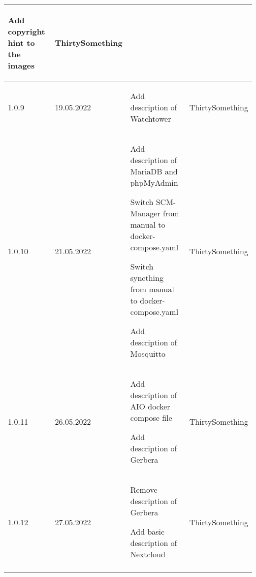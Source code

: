 \begin{tiny}
\begin{longtable}{ | p{} | p{} | P{0.49\textwidth} | p{0.15\textwidth} | }
\begin{tsLTItemize}
            \item Add copyright hint to the images
        \end{tsLTItemize}
                                 &
        ThirtySomething            \\
        \hline
        1.0.9                    &
        19.05.2022               &
        \begin{tsLTItemize}
            \item Add description of Watchtower
        \end{tsLTItemize}
                                 &
        ThirtySomething            \\
        \hline
        1.0.10                   &
        21.05.2022               &
        \begin{tsLTItemize}
            \item Add description of MariaDB and phpMyAdmin
            \item Switch SCM-Manager from manual to docker-compose.yaml
            \item Switch syncthing from manual to docker-compose.yaml
            \item Add description of Mosquitto
        \end{tsLTItemize}
                                 &
        ThirtySomething            \\
        \hline
        1.0.11                   &
        26.05.2022               &
        \begin{tsLTItemize}
            \item Add description of AIO docker compose file
            \item Add description of Gerbera
        \end{tsLTItemize}
                                 &
        ThirtySomething            \\
        \hline
        1.0.12                   &
        27.05.2022               &
        \begin{tsLTItemize}
            \item Remove description of Gerbera
            \item Add basic description of Nextcloud
        \end{tsLTItemize}
                                 &
        ThirtySomething            \\
        \hline
    \end{longtable}
\end{tiny}
